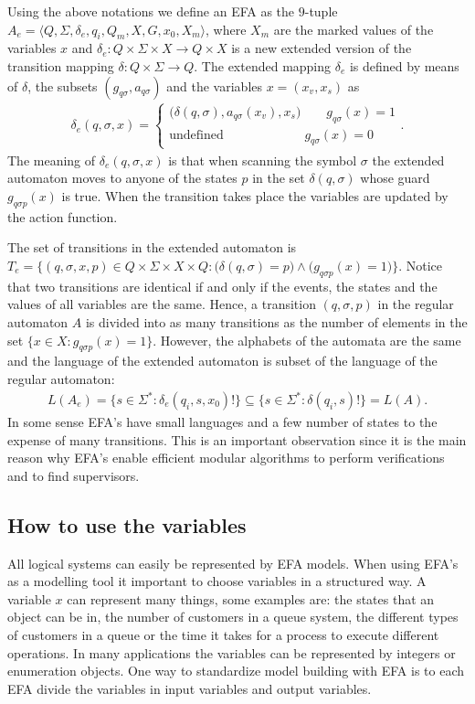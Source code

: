 \documentclass{article}
\begin{document}
Using the above notations we define an EFA as the
$9$-tuple $A_{e}=\langle Q, \Sigma, \delta_{e}, q_i, Q_m, X, G
,x_0, X_m \rangle$, where $X_m$ are the marked values of the
variables $x$ and $\delta_{e}: Q \times \Sigma \times X
\rightarrow Q\times X $ is a new extended version of the
transition mapping $\delta:Q \times \Sigma \rightarrow Q$. The
extended mapping $\delta_e$ is defined by means of
$\delta$, the subsets $(g_{q\sigma},a_{q\sigma})$ and the variables $x=(x_v, x_s)$ as
\begin{eqnarray}
\delta_{e}(q,\sigma,x)=\left\{
\begin{array}{ll}
(\delta(q,\sigma),a_{q \sigma}(x_v),x_s \big)\quad\quad g_{q \sigma}(x)=1\\
\textrm{undefined  } \quad\quad\quad\quad\quad\quad g_{q
\sigma}(x)=0
\end{array}\right..
\end{eqnarray}
The meaning of $\delta_{e}(q,\sigma,x)$ is that when scanning
the symbol $\sigma$ the extended automaton moves to anyone of the
states $p$ in the set $\delta(q,\sigma)$ whose guard $g_{q
\sigma p}(x)$ is true. When the transition takes place the variables are
updated by the action function.

The set of transitions in the extended automaton is
$T_e=\{(q,\sigma,x,p)\in Q \times \Sigma\times X\times Q:
\big(\delta(q,\sigma)=p \big)\wedge \big(g_{q
\sigma p}(x)=1\big)\}$. Notice that two transitions are
identical if and only if the events, the states and the values
of all variables are the same. Hence, a transition $(q,\sigma,p)$ in the
regular automaton $A$ is divided into as many transitions as the number
of elements in the set $\{x\in X:g_{q
\sigma p}(x)=1\}$. However, the
alphabets of the automata are the same and the language of the
extended automaton is subset of the language of the regular automaton:
\begin{eqnarray}
L(A_e)=\{s\in \Sigma^*:
\delta_e(q_i,s,x_0)!\}\subseteq \{s\in \Sigma^*:
\delta(q_i,s)!\}=L(A).
\end{eqnarray}
In some sense EFA's have small languages and a few number of
states to the expense of many transitions. This is an important observation
since it is the main reason why EFA's enable efficient modular algorithms to perform
verifications and to find supervisors.
\subsection{How to use the variables}
All logical systems can easily be represented by
EFA models. When using EFA's as a modelling tool it important to choose variables in a structured way.
A variable $x$ can represent many things, some examples  are: the states that an object can be in,
 the number of customers in a queue system, the different types of customers in a queue or the time it
takes for a process to execute different operations. In many applications the variables can be represented by
 integers or enumeration objects. One way to standardize model building with EFA is to each EFA divide the
 variables in input variables and output variables.
\end{document}
